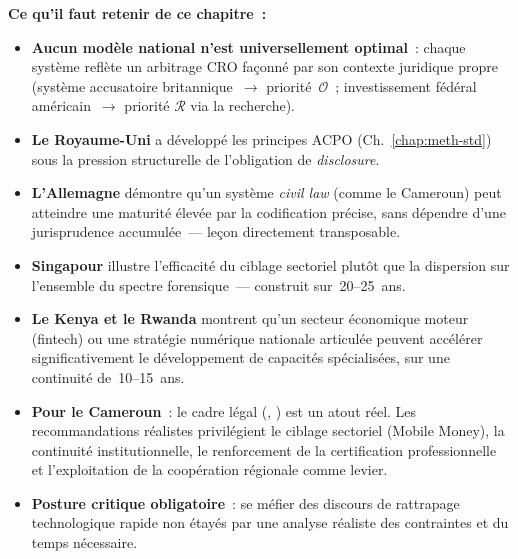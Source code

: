 \separateur

\begin{boxresume}
\textbf{Ce qu'il faut retenir de ce chapitre~:}
\begin{itemize}
    \item \textbf{Aucun modèle national n'est universellement
          optimal}~: chaque système reflète un arbitrage CRO
          façonné par son contexte juridique propre (système
          accusatoire britannique~$\to$ priorité~$\mathcal{O}$~;
          investissement fédéral américain~$\to$ priorité
          $\mathcal{R}$ via la recherche).

    \item \textbf{Le Royaume-Uni} a développé les principes ACPO
          (Ch.~\ref{chap:meth-std}) sous la pression structurelle
          de l'obligation de \textit{disclosure}.

    \item \textbf{L'Allemagne} démontre qu'un système \textit{civil
          law} (comme le Cameroun) peut atteindre une maturité
          élevée par la codification précise, sans dépendre
          d'une jurisprudence accumulée~--- leçon directement
          transposable.

    \item \textbf{Singapour} illustre l'efficacité du ciblage
          sectoriel plutôt que la dispersion sur l'ensemble
          du spectre forensique~--- construit sur~20--25~ans.

    \item \textbf{Le Kenya et le Rwanda} montrent qu'un secteur
          économique moteur (fintech) ou une stratégie numérique
          nationale articulée peuvent accélérer significativement
          le développement de capacités spécialisées, sur une
          continuité de~10--15~ans.

    \item \textbf{Pour le Cameroun}~: le cadre légal
          (, ) est un atout réel.
          Les recommandations réalistes privilégient le ciblage
          sectoriel (Mobile Money), la continuité institutionnelle,
          le renforcement de la certification professionnelle et
          l'exploitation de la coopération régionale comme levier.

    \item \textbf{Posture critique obligatoire}~: se méfier des
          discours de rattrapage technologique rapide non étayés
          par une analyse réaliste des contraintes et du temps
          nécessaire.
\end{itemize}
\end{boxresume}

